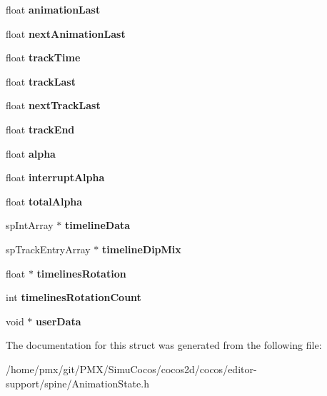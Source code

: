 \begin{DoxyCompactItemize}
float {\bfseries animation\+Last}
\item 
\mbox{\label{structspTrackEntry_afe32d83dff59f8156d1ed389e8866e3f}} 
float {\bfseries next\+Animation\+Last}
\item 
\mbox{\label{structspTrackEntry_aad68e6c11b114a23cb32fe376a91d08a}} 
float {\bfseries track\+Time}
\item 
\mbox{\label{structspTrackEntry_aa40982e7b59c45e1b1542924375eecba}} 
float {\bfseries track\+Last}
\item 
\mbox{\label{structspTrackEntry_adf3b1a2f7e6c5f13d0c067c94e631b78}} 
float {\bfseries next\+Track\+Last}
\item 
\mbox{\label{structspTrackEntry_a7f70297396399108528de67d5a9f78f9}} 
float {\bfseries track\+End}
\item 
\mbox{\label{structspTrackEntry_ac96a4ec2a734576c2d1f4b10759945e6}} 
float {\bfseries alpha}
\item 
\mbox{\label{structspTrackEntry_a7e6b0d7276932ab5111d76c454853040}} 
float {\bfseries interrupt\+Alpha}
\item 
\mbox{\label{structspTrackEntry_aa77c973e585f80e5ba065bfade0611bd}} 
float {\bfseries total\+Alpha}
\item 
\mbox{\label{structspTrackEntry_ab48abb4bd36baccd1475292694aad0ba}} 
sp\+Int\+Array $\ast$ {\bfseries timeline\+Data}
\item 
\mbox{\label{structspTrackEntry_a24eb6381645e7570e93089e0b3468bed}} 
sp\+Track\+Entry\+Array $\ast$ {\bfseries timeline\+Dip\+Mix}
\item 
\mbox{\label{structspTrackEntry_a159f4e21c3358681aa128b6de282a708}} 
float $\ast$ {\bfseries timelines\+Rotation}
\item 
\mbox{\label{structspTrackEntry_a5aeaa3b725086524831ef39d3cfc62f0}} 
int {\bfseries timelines\+Rotation\+Count}
\item 
\mbox{\label{structspTrackEntry_aa72331bff2d5003e64eb925ade1e51af}} 
void $\ast$ {\bfseries user\+Data}
\end{DoxyCompactItemize}


The documentation for this struct was generated from the following file\+:\begin{DoxyCompactItemize}
\item 
/home/pmx/git/\+P\+M\+X/\+Simu\+Cocos/cocos2d/cocos/editor-\/support/spine/Animation\+State.\+h\end{DoxyCompactItemize}

